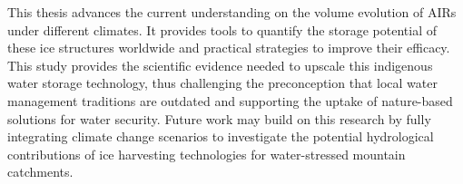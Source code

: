 This thesis advances the current understanding on the volume evolution of AIRs under different climates. It
provides tools to quantify the storage potential of these ice structures worldwide and practical strategies to
improve their efficacy. This study provides the scientific evidence needed to upscale this indigenous water
storage technology, thus challenging the preconception that local water management traditions are outdated and
supporting the uptake of nature-based solutions for water security. Future work may build on this research by
fully integrating climate change scenarios to investigate the potential hydrological contributions of ice
harvesting technologies for water-stressed mountain catchments.
